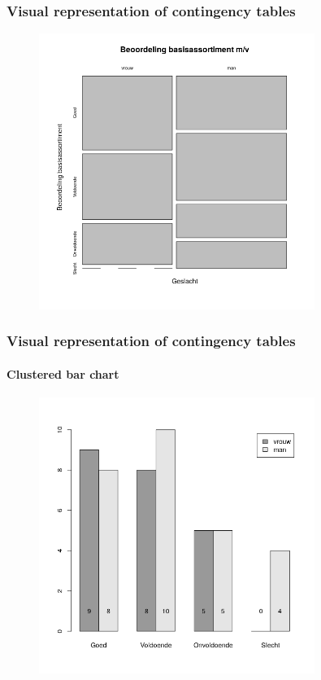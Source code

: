 \documentclass{beamer}
\begin{document}
\begin{frame}
  \frametitle{Visual representation of contingency tables}
  
  \begin{figure}
    \centering
    \includegraphics[width=0.80\textwidth]{img/2var-xtab-plot-waardering}
  \end{figure}
  
\end{frame}

\begin{frame}
  \frametitle{Visual representation of contingency tables}
  \framesubtitle{Clustered bar chart}

  \begin{figure}
    \centering
    \includegraphics[width=0.80\textwidth]{img/2var-staafgrafiek-geclusterd}
  \end{figure}

\end{frame}
\end{document}
